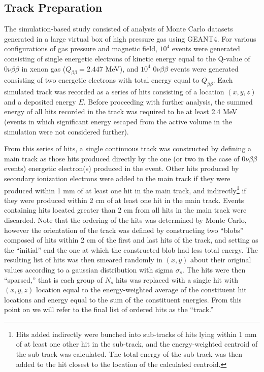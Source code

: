 \documentclass{JINST}
\begin{document}
\subsection{Track Preparation}\label{ssec:track}
The simulation-based study consisted of analysis of Monte Carlo datasets generated in a large virtual box of high pressure gas using GEANT4.  For various configurations of gas pressure and magnetic field, $10^4$ events were generated consisting of single energetic electrons of kinetic energy equal to the Q-value of $0\nu\beta\beta$ in xenon gas ($Q_{\beta\beta} = 2.447$ MeV), and $10^4$ $0\nu\beta\beta$ events were generated consisting of two energetic electrons with total energy equal to $Q_{\beta\beta}$.  Each simulated track was recorded as a series of hits consisting of a location $(x,y,z)$ and a deposited energy $E$.  Before proceeding with further analysis, the summed energy of all hits recorded in the track was required to be at least 2.4 MeV (events in which significant energy escaped from the active volume in the simulation were not considered further).

From this series of hits, a single continuous track was constructed by defining a main track as those hits produced directly by the one (or two in the case of $0\nu\beta\beta$ events) energetic electron(s) produced in the event.  Other hits produced by secondary ionization electrons were added to the main track if they were produced within 1 mm of at least one hit in the main track, and indirectly\footnote{Hits added indirectly were bunched into sub-tracks of hits lying within 1 mm of at least one other hit in the sub-track, and the energy-weighted centroid of the sub-track was calculated.  The total energy of the sub-track was then added to the hit closest to the location of the calculated centroid.} if they were produced within 2 cm of at least one hit in the main track.  Events containing hits located greater than 2 cm from all hits in the main track were discarded.  Note that the ordering of the hits was determined by Monte Carlo, however the orientation of the track was defined by constructing two ``blobs'' composed of hits within 2 cm of the first and last hits of the track, and setting as the ``initial'' end the one at which the constructed blob had less total energy.  The resulting list of hits was then smeared randomly in $(x,y)$ about their original values according to a gaussian distribution with sigma $\sigma_{s}$.  The hits were then ``sparsed,'' that is each group of $N_{s}$ hits was replaced with a single hit with $(x,y,z)$ location equal to the energy-weighted average of the constituent hit locations and energy equal to the sum of the constituent energies.  From this point on we will refer to the final list of ordered hits as the ``track.''
\end{document}
